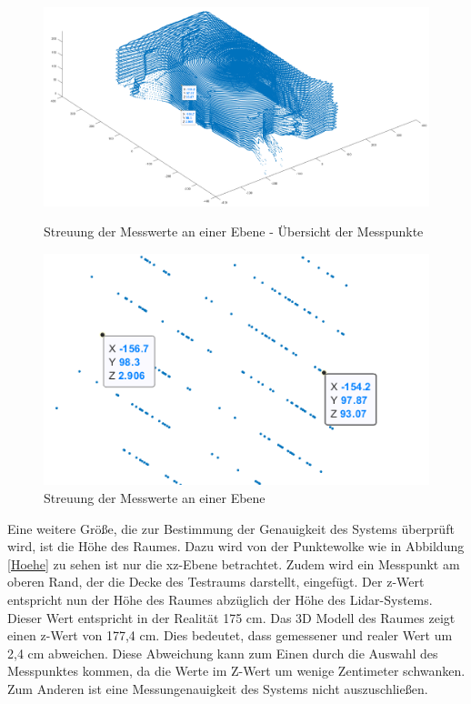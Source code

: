 \begin{figure}[htb]
	\centering
	\begin{minipage}[t]{0.45\linewidth}
		\centering
		\includegraphics[width=1.2\linewidth]{images/Validierung/Genauigkeit/wandbreite_alles.png}
		\caption{Streuung der Messwerte an einer Ebene - Übersicht der Messpunkte}
		\label{wandbreite_alles}
	\end{minipage}
	\hfill
	\begin{minipage}[t]{0.45\linewidth}
		\centering
		\includegraphics[width=1.2\linewidth]{images/Validierung/Genauigkeit/wandbreite.png}
		\caption{Streuung der Messwerte an einer Ebene}
		\label{wandbreite_label}
	\end{minipage}
\end{figure}


Eine weitere Größe, die zur Bestimmung der Genauigkeit des Systems überprüft wird, ist die Höhe des Raumes. Dazu wird von der Punktewolke wie in Abbildung \ref{Hoehe} zu sehen ist nur die xz-Ebene betrachtet. Zudem wird ein Messpunkt am oberen Rand, der die Decke des Testraums darstellt, eingefügt. Der z-Wert entspricht nun der Höhe des Raumes abzüglich der Höhe des Lidar-Systems. Dieser Wert entspricht in der Realität 175 cm. Das 3D Modell des Raumes zeigt einen z-Wert von 177,4 cm. Dies bedeutet, dass gemessener und realer Wert um 2,4 cm abweichen.
Diese Abweichung kann zum Einen durch die Auswahl des Messpunktes kommen, da die Werte im Z-Wert um wenige Zentimeter schwanken. Zum Anderen ist eine Messungenauigkeit des Systems nicht auszuschließen.
 

